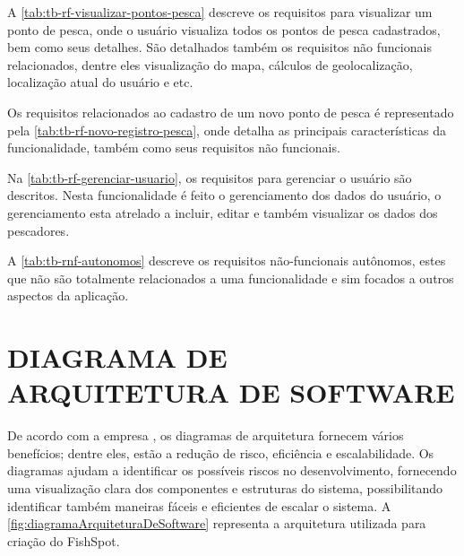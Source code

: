 

A \autoref{tab:tb-rf-visualizar-pontos-pesca} descreve os requisitos para visualizar um ponto de pesca, onde o usuário visualiza todos os pontos de pesca cadastrados, bem como seus detalhes. São detalhados também os requisitos não funcionais relacionados, dentre eles visualização do mapa, cálculos de geolocalização, localização atual do usuário e etc.



Os requisitos relacionados ao cadastro de um novo ponto de pesca é representado pela \autoref{tab:tb-rf-novo-registro-pesca}, onde detalha as principais características da funcionalidade, também como seus requisitos não funcionais.



Na \autoref{tab:tb-rf-gerenciar-usuario}, os requisitos para gerenciar o usuário são descritos. Nesta funcionalidade é feito o gerenciamento dos dados do usuário, o gerenciamento esta atrelado a incluir, editar e também visualizar os dados dos pescadores.



A \autoref{tab:tb-rnf-autonomos} descreve os requisitos não-funcionais autônomos, estes que não são totalmente relacionados a uma funcionalidade e sim focados a outros aspectos da aplicação.



\section{DIAGRAMA DE ARQUITETURA DE SOFTWARE}
\label{sec:diagramadearquiteturadesoftware}

De acordo com a empresa , os diagramas de arquitetura fornecem vários benefícios; dentre eles, estão a redução de risco, eficiência e escalabilidade. Os diagramas ajudam a identificar os possíveis riscos no desenvolvimento, fornecendo uma visualização clara dos componentes e estruturas do sistema, possibilitando identificar também maneiras fáceis e eficientes de escalar o sistema. A \autoref{fig:diagramaArquiteturaDeSoftware} representa a arquitetura utilizada para criação do FishSpot.

